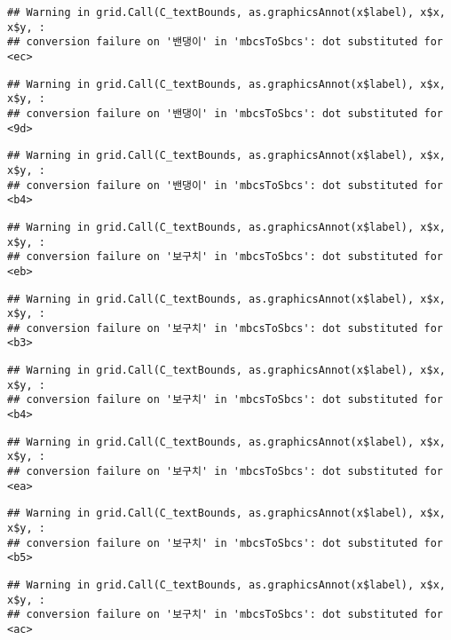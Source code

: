 \documentclass[
]{article}
\begin{document}
\begin{verbatim}
## Warning in grid.Call(C_textBounds, as.graphicsAnnot(x$label), x$x, x$y, :
## conversion failure on '밴댕이' in 'mbcsToSbcs': dot substituted for <ec>
\end{verbatim}

\begin{verbatim}
## Warning in grid.Call(C_textBounds, as.graphicsAnnot(x$label), x$x, x$y, :
## conversion failure on '밴댕이' in 'mbcsToSbcs': dot substituted for <9d>
\end{verbatim}

\begin{verbatim}
## Warning in grid.Call(C_textBounds, as.graphicsAnnot(x$label), x$x, x$y, :
## conversion failure on '밴댕이' in 'mbcsToSbcs': dot substituted for <b4>
\end{verbatim}

\begin{verbatim}
## Warning in grid.Call(C_textBounds, as.graphicsAnnot(x$label), x$x, x$y, :
## conversion failure on '보구치' in 'mbcsToSbcs': dot substituted for <eb>
\end{verbatim}

\begin{verbatim}
## Warning in grid.Call(C_textBounds, as.graphicsAnnot(x$label), x$x, x$y, :
## conversion failure on '보구치' in 'mbcsToSbcs': dot substituted for <b3>
\end{verbatim}

\begin{verbatim}
## Warning in grid.Call(C_textBounds, as.graphicsAnnot(x$label), x$x, x$y, :
## conversion failure on '보구치' in 'mbcsToSbcs': dot substituted for <b4>
\end{verbatim}

\begin{verbatim}
## Warning in grid.Call(C_textBounds, as.graphicsAnnot(x$label), x$x, x$y, :
## conversion failure on '보구치' in 'mbcsToSbcs': dot substituted for <ea>
\end{verbatim}

\begin{verbatim}
## Warning in grid.Call(C_textBounds, as.graphicsAnnot(x$label), x$x, x$y, :
## conversion failure on '보구치' in 'mbcsToSbcs': dot substituted for <b5>
\end{verbatim}

\begin{verbatim}
## Warning in grid.Call(C_textBounds, as.graphicsAnnot(x$label), x$x, x$y, :
## conversion failure on '보구치' in 'mbcsToSbcs': dot substituted for <ac>
\end{verbatim}
\end{document}
